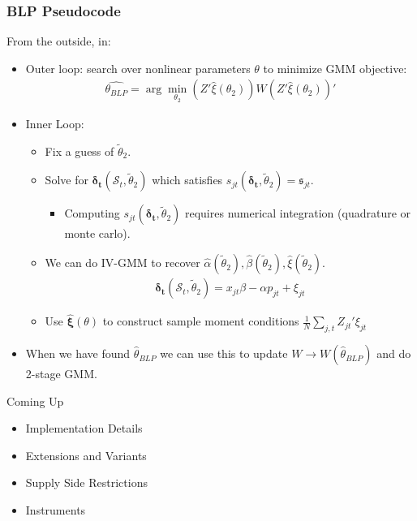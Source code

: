 \documentclass[xcolor=pdftex,dvipsnames,table,mathserif,aspectratio=169]{beamer}
\begin{document}
 \begin{frame}
\frametitle{BLP Pseudocode}
\footnotesize
From the outside, in:
\begin{itemize}
\item Outer loop: search over nonlinear parameters $\theta$ to minimize GMM objective:
 \begin{align*}
 \widehat{\theta_{BLP}} = \arg \min_{\theta_2} (Z' \hat{\xi}(\theta_2)) W  (Z' \hat{\xi}(\theta_2))'
 \end{align*}
 \item Inner Loop:
 \begin{itemize}
\item Fix a guess of $\widetilde{\theta}_2$.
\item Solve for $\boldsymbol{\delta_t}(\mathcal{S}_t,\widetilde{\theta}_2)$ which satisfies $s_{jt}(\boldsymbol{\delta_t},\widetilde{\theta}_2) = \mathfrak{s}_{jt}$.
\begin{itemize}
\item Computing $s_{jt}(\boldsymbol{\delta_t},\widetilde{\theta}_2)$ requires numerical integration (quadrature or monte carlo).
\end{itemize}
 \item We can do IV-GMM to recover $\hat{\alpha}(\widetilde{\theta}_2),\hat{\beta}(\widetilde{\theta}_2),\hat{\xi}(\widetilde{\theta}_2)$.
  \begin{align*}
\boldsymbol{\delta_t}(\mathcal{S}_t,\widetilde{\theta}_2)= x_{jt} \beta -\alpha p_{jt}+  \xi_{jt}
 \end{align*}
  \item Use $\boldsymbol{\hat{\xi}}(\theta)$ to construct sample moment conditions $\frac{1}{N} \sum_{j,t} Z_{jt}' \xi_{jt}$
 \end{itemize}
 \item When we have found $\hat{\theta}_{BLP}$ we can use this to update $W \rightarrow W(\hat{\theta}_{BLP})$ and do 2-stage GMM.
 \end{itemize}
\end{frame}

\begin{frame}{Coming Up}
\begin{itemize}
\item Implementation Details
\item Extensions and Variants
\item Supply Side Restrictions
\item Instruments
\end{itemize}

\end{frame}
\end{document}
